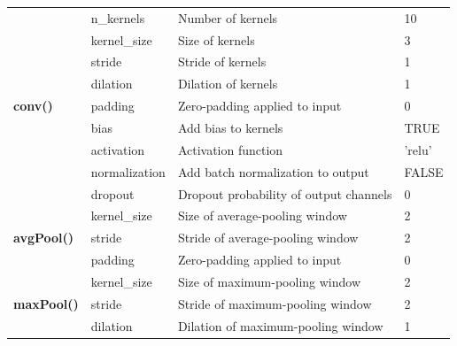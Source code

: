 \documentclass[12pt,twoside]{scrreport}
\begin{document}
\begin{table}[t]
{\begin{tabular}{|llll|}
			\multirow{9}{*}{\textbf{conv()}}     & n\_kernels    & Number of kernels                                                                                                  & 10        \\
			& kernel\_size  & Size of kernels                                                                           & 3         \\
			& stride        & Stride of kernels                                                                     & 1         \\
			& dilation      & Dilation of kernels                                                                 & 1         \\
			& padding       & Zero-padding applied to input                                        & 0         \\
			& bias          & Add bias to kernels                                                              & TRUE      \\
			& activation    & Activation function                                         & 'relu'    \\
			& normalization & Add batch normalization to output                                                      & FALSE     \\
			& dropout       & Dropout probability of output channels                          & 0         \\ \hline
			\multirow{3}{*}{\textbf{avgPool()}}  & kernel\_size  & Size of average-pooling window                                                                                                    & 2         \\
			& stride        & Stride of average-pooling window                                                                                                  & 2         \\
			& padding       & Zero-padding applied to input                                     & 0         \\ \hline
			\multirow{4}{*}{\textbf{maxPool()}}  & kernel\_size  & Size of maximum-pooling window                                                                                                    & 2         \\
			& stride        & Stride of maximum-pooling window                                                                                                  & 2         \\
			& dilation      & Dilation of maximum-pooling window                                                                                                & 1         \\

\end{tabular}}
\end{table}
\end{document}
